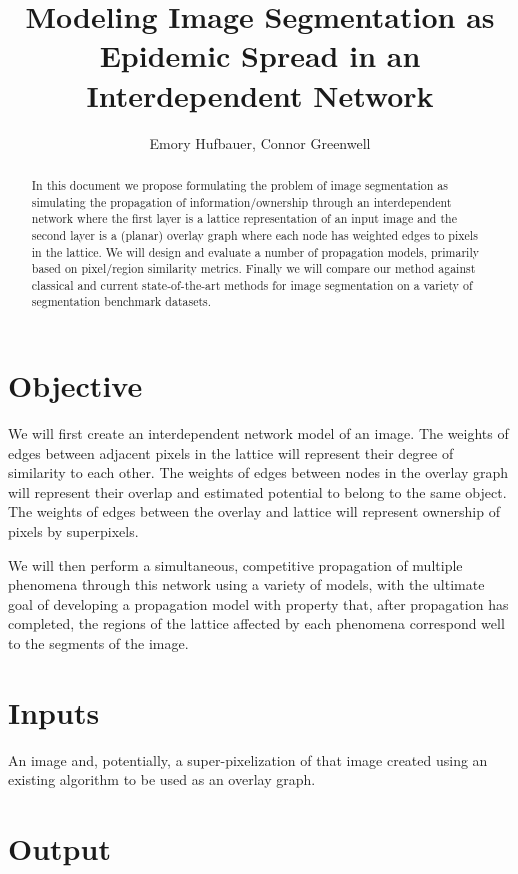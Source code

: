 \documentclass[twocolumn]{article}
\title{Modeling Image Segmentation as Epidemic Spread in an Interdependent Network}
\author{Emory Hufbauer, Connor Greenwell}
\date{}
\begin{document}
\maketitle

\begin{abstract}
In this document we propose formulating the problem of image segmentation as simulating the propagation of
information/ownership through an interdependent network where the first layer is a lattice representation of an input image
and the second layer is a (planar) overlay graph where each node has weighted edges to pixels in the lattice. We will design
and evaluate a number of propagation models, primarily based on pixel/region similarity metrics. Finally we will compare our
method against classical and current state-of-the-art methods for image segmentation on a variety of segmentation benchmark
datasets. 
\end{abstract}

\section{Objective}

We will first create an interdependent network model of an image. The weights of edges between adjacent pixels in the lattice
will represent their degree of similarity to each other. The weights of edges between nodes in the overlay graph will
represent their overlap and estimated potential to belong to the same object. The weights of edges between the overlay and
lattice will represent ownership of pixels by superpixels.

We will then perform a simultaneous, competitive propagation of multiple phenomena through this network using a variety of
models, with the ultimate goal of developing a propagation model with property that, after propagation has completed, the
regions of the lattice affected by each phenomena correspond well to the segments of the image.

\section{Inputs}

An image and, potentially, a super-pixelization of that image created using an existing algorithm to be used as an overlay
graph.

\section{Output}
\end{document}
